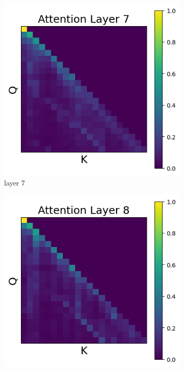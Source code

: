 \documentclass[11pt]{article}
\begin{document}
\begin{figure}[t]
    \begin{subfigure}[t]{0.24\textwidth}
    \centering
    \includegraphics[width=1.4\columnwidth]{figures/intervention2/layer_7.png}
    \caption{layer 7}
  \end{subfigure}\hfill
      \begin{subfigure}[t]{0.24\textwidth}
    \centering
    \includegraphics[width=1.4\columnwidth]{figures/intervention2/layer_8.png}

\end{subfigure}
\end{figure}
\end{document}
